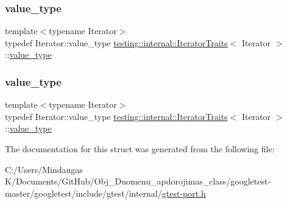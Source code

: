 \mbox{\label{structtesting_1_1internal_1_1_iterator_traits_a29de4320a9c53ce438d3561b94e515bb}} 
\subsubsection{\texorpdfstring{value\_type}{value\_type}\hspace{0.1cm}{\footnotesize\ttfamily [2/3]}}
{\footnotesize\ttfamily template$<$typename Iterator$>$ \\
typedef Iterator\+::value\+\_\+type \mbox{\hyperlink{structtesting_1_1internal_1_1_iterator_traits}{testing\+::internal\+::\+Iterator\+Traits}}$<$ Iterator $>$\+::\mbox{\hyperlink{structtesting_1_1internal_1_1_iterator_traits_a29de4320a9c53ce438d3561b94e515bb}{value\+\_\+type}}}

\mbox{\label{structtesting_1_1internal_1_1_iterator_traits_a29de4320a9c53ce438d3561b94e515bb}} 
\subsubsection{\texorpdfstring{value\_type}{value\_type}\hspace{0.1cm}{\footnotesize\ttfamily [3/3]}}
{\footnotesize\ttfamily template$<$typename Iterator$>$ \\
typedef Iterator\+::value\+\_\+type \mbox{\hyperlink{structtesting_1_1internal_1_1_iterator_traits}{testing\+::internal\+::\+Iterator\+Traits}}$<$ Iterator $>$\+::\mbox{\hyperlink{structtesting_1_1internal_1_1_iterator_traits_a29de4320a9c53ce438d3561b94e515bb}{value\+\_\+type}}}



The documentation for this struct was generated from the following file\+:\begin{DoxyCompactItemize}
\item 
C\+:/\+Users/\+Mindaugas K/\+Documents/\+Git\+Hub/\+Obj\+\_\+\+Duomenu\+\_\+apdorojimas\+\_\+class/googletest-\/master/googletest/include/gtest/internal/\mbox{\hyperlink{googletest-master_2googletest_2include_2gtest_2internal_2gtest-port_8h}{gtest-\/port.\+h}}\end{DoxyCompactItemize}
